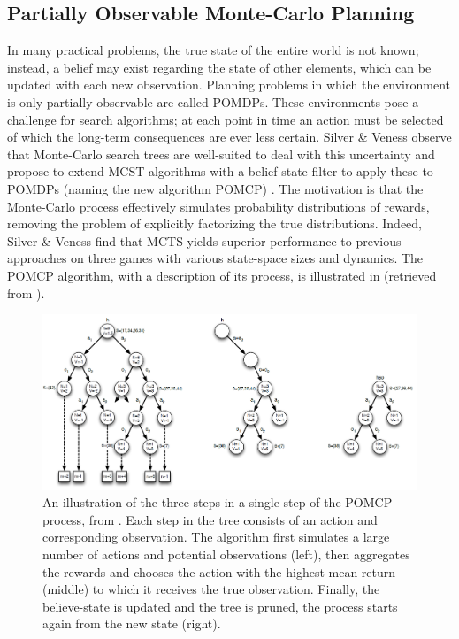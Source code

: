 \subsection{Partially Observable Monte-Carlo Planning}
In many practical problems, the true state of the entire world is not known; instead, a belief may exist regarding the state of other elements, which can be updated with each new observation. Planning problems in which the environment is only partially observable are called POMDPs. These environments pose a challenge for search algorithms; at each point in time an action must be selected of which the long-term consequences are ever less certain. Silver \& Veness observe that Monte-Carlo search trees are well-suited to deal with this uncertainty and propose to extend MCST algorithms with a belief-state filter to apply these to POMDPs (naming the new algorithm POMCP) \cite{silver2010monte}. The motivation is that the Monte-Carlo process effectively simulates probability distributions of rewards, removing the problem of explicitly factorizing the true distributions. Indeed, Silver \& Veness find that MCTS yields superior performance to previous approaches on three games with various state-space sizes and dynamics. The POMCP algorithm, with a description of its process, is illustrated in  (retrieved from \cite{silver2010monte}). 

\begin{figure}[ht!]
\includegraphics[width=\linewidth]{pomdp.png}
\caption{An illustration of the three steps in a single step of the POMCP process, from \cite{silver2010monte}. Each step in the tree consists of an action and corresponding observation. The algorithm first simulates a large number of actions and potential observations (left), then aggregates the rewards and chooses the action with the highest mean return (middle) to which it receives the true observation. Finally, the believe-state is updated and the tree is pruned, the process starts again from the new state (right).}
\label{fig:pomcp}
\end{figure}
